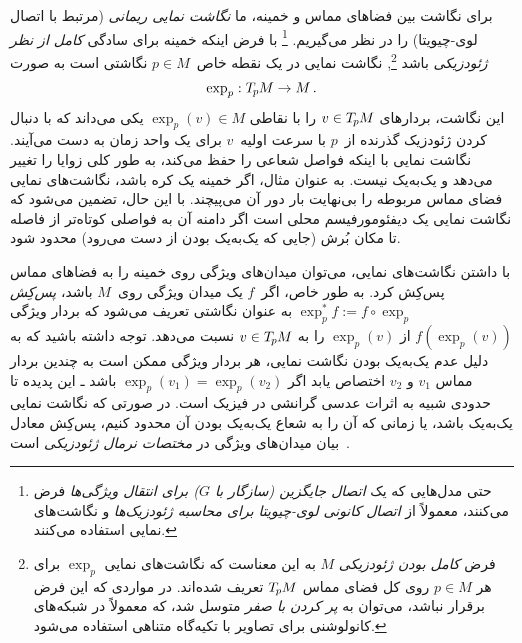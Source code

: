 برای نگاشت بین فضاهای مماس و خمینه، ما \emph{نگاشت نمایی ریمانی} (مرتبط با اتصال لوی-چیویتا) را در نظر می‌گیریم.%
\footnote{
	حتی مدل‌هایی که یک \emph{اتصال جایگزین (سازگار با $G$) برای انتقال ویژگی‌ها} فرض می‌کنند، معمولاً از \emph{اتصال کانونی لوی-چیویتا برای محاسبه ژئودزیک‌ها} و نگاشت‌های نمایی استفاده می‌کنند.
}
با فرض اینکه خمینه برای سادگی \emph{کامل از نظر ژئودزیکی} باشد%
\footnote{
	فرض \emph{کامل بودن ژئودزیکی} $M$ به این معناست که نگاشت‌های نمایی $\exp_p$ برای هر $p \in M$ روی کل فضای مماس $T_{\mkern-1.5mu p}\mkern-.5muM$ تعریف شده‌اند.
	در مواردی که این فرض برقرار نباشد، می‌توان به \emph{پر کردن با صفر} متوسل شد، که معمولاً در شبکه‌های کانولوشنی برای تصاویر با تکیه‌گاه متناهی استفاده می‌شود.
},
نگاشت نمایی در یک نقطه خاص~$p\in M$ نگاشتی است به صورت
\begin{align}
	\exp_p: T_{\mkern-1.5mu p}\mkern-.5muM \to M \,.
\end{align}
این نگاشت، بردارهای $v\in T_{\mkern-1.5mu p}\mkern-.5muM$ را با نقاطی $\exp_p(v) \in M$ یکی می‌داند که با دنبال کردن ژئودزیک گذرنده از~$p$ با سرعت اولیه~$v$ برای یک واحد زمان به دست می‌آیند.
نگاشت نمایی با اینکه فواصل شعاعی را حفظ می‌کند، به طور کلی زوایا را تغییر می‌دهد و یک‌به‌یک نیست.
به عنوان مثال، اگر خمینه یک کره باشد، نگاشت‌های نمایی فضای مماس مربوطه را بی‌نهایت بار دور آن می‌پیچند.
با این حال، تضمین می‌شود که نگاشت نمایی یک دیفئومورفیسم محلی است اگر دامنه آن به فواصلی کوتاه‌تر از فاصله تا مکان بُرش (جایی که یک‌به‌یک بودن از دست می‌رود) محدود شود.

با داشتن نگاشت‌های نمایی، می‌توان میدان‌های ویژگی روی خمینه را به فضاهای مماس پس‌کِش کرد.
به طور خاص، اگر~$f$ یک میدان ویژگی روی~$M$ باشد، \emph{پس‌کِش} $\exp_p^*f := f \circ \exp_p$ به عنوان نگاشتی تعریف می‌شود که بردار ویژگی $f(\exp_p(v))$ از $\exp_p(v)$ را به $v\in T_{\mkern-1.5mu p}\mkern-.5muM$ نسبت می‌دهد.
توجه داشته باشید که به دلیل عدم یک‌به‌یک بودن نگاشت نمایی، هر بردار ویژگی ممکن است به چندین بردار مماس $v_1$ و $v_2$ اختصاص یابد اگر $\exp_p(v_1) = \exp_p(v_2)$ باشد ـ این پدیده تا حدودی شبیه به اثرات عدسی گرانشی در فیزیک است.
در صورتی که نگاشت نمایی یک‌به‌یک باشد، یا زمانی که آن را به شعاع یک‌به‌یک بودن آن محدود کنیم، پس‌کِش معادل بیان میدان‌های ویژگی در \emph{مختصات نرمال ژئودزیکی} است~\cite{masci2015geodesic}.


